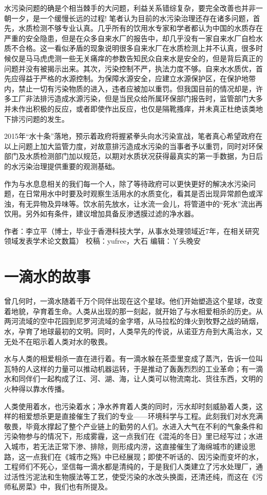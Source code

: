 \documentclass[]{book}
\begin{document}
水污染问题的确是个相当棘手的大问题，利益关系错综复杂，要完全改善也并非一朝一夕，是一个缓慢长远的过程! 笔者认为目前的水污染治理还存在诸多问题，首先，水质检测不够专业认真。几乎所有的饮用水专家和学者都认为中国的水质存在严重的安全隐患，但是在众多自来水厂的报告中，却几乎没有一家自来水厂自检水质不合格。这一看似矛盾的现象说明很多自来水厂在水质检测上并不认真，很多时候仅是马马虎虎测一些无关痛痒的参数告知民众自来水是安全的，但是背后真正的问题并没有被揭示出来。其次，污染控制不严，执法力度不够。自来水水质优，首先应得益于严格的水源控制。为保障水源安全，应建立水源保护区，在保护地带内，禁止一切有污染物质的进入，违者应被加以重罚。但我国目前的情况却是，许多工厂非法排污造成水源污染，但是当民众给所属环保部门报告时，监管部门大多并未作出积极的反应，或者即使作出反应，也仅是隔靴搔痒，并未真正杜绝该类地下排污问题的发生。

2015年``水十条''落地，预示着政府将握紧拳头向水污染宣战，笔者真心希望政府在以上问题上加大监管力度，对故意排污造成水污染的当事者予以重罚，同时对环保部门及水质检测部门加以规范，以期对水质状况获得最真实的第一手数据，为日后的水污染治理提供重要的观测基础。

作为与水息息相关的我们每一个人，除了等待政府可以更快更好的解决水污染问题，在日常用水中时要及时观察生活用水的水质变化，看其是否出现异常颜色或浑浊，有无异物及异味等。饮水前先放水，让水流一会儿，将管道中的``死水''流出再饮用。另外如有条件，建议增加具备反渗透膜过滤的净水器。

作者：李立平（博士，毕业于香港科技大学，从事水处理领域近7年，在相关研究领域发表学术论文数篇）
校稿：yufree，大石
编辑：丫头晚安

\hypertarget{ux4e00ux6ef4ux6c34ux7684ux6545ux4e8b}{%
\section{一滴水的故事}\label{ux4e00ux6ef4ux6c34ux7684ux6545ux4e8b}}

曾几何时，一滴水随着千万个同伴出现在这个星球。他们开始塑造这个星球，改变着地貌，孕育着生命。人类从出现的那一刻起，就开始了与水相爱相杀的历史。从两河流域的空中花园到尼罗河流域的金字塔，从马拉松的烽火到牧野之战的硝烟，水，孕育了地球最初的文明。同时，人类早先的传说，从诺亚方舟到大禹治水，又无处不在昭示着人类对水的敬畏。

水与人类的相爱相杀一直在进行着。有一滴水躲在茶壶里变成了蒸汽，告诉一位叫瓦特的人这样的力量可以推动机器运转，于是推动了轰轰烈烈的工业革命；有一滴水和同伴们一起构成了江、河、湖、海，让人类可以物流南北、货往东西，文明的火种得以靠水传播。

人类使用着水，也污染着水；净水养育着人类的同时，污水却时刻威胁着人类，这样的相爱想杀更是直接催生了我们的专业------环境科学与工程。此刻我们对水充满敬畏，毕竟水撑起了整个产业链上的勤劳的人们。水进入大气在不利的气象条件和污染物参与的情况下，形成雾霾，这一点我们在《混沌的冬日》里已经写过；水进入城市，若无法正常下渗、排除，则形成内涝，这直接催生了海绵城市的建设思路，这一点我们在《城市之殇》中已经展现；即使不听话的、因污染而变坏的水，工程师们不死心，坚信每一滴水都是清纯的，于是我们人类建立了污水处理厂，通过活性污泥法和生物膜法等工艺，使受污染的水改头换面，还清还纯，而这在《污师私房菜》中，我们也有所提及。
\end{document}

